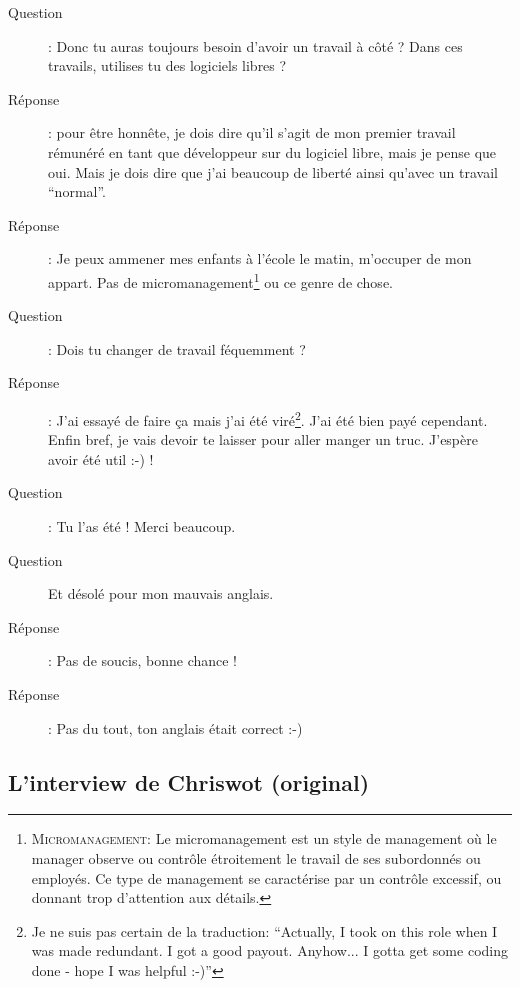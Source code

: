 \documentclass[a4paper,12pt, draft]{report}
\begin{document}
\begin{description}
\item [Question]:  Donc tu auras toujours besoin d'avoir un travail à côté ? Dans ces travails, utilises tu des logiciels libres ?
\item [Réponse]:  pour être honnête, je dois dire qu'il s'agit de mon premier travail rémunéré en tant que développeur sur du logiciel libre, mais je pense que oui. Mais je dois dire que j'ai beaucoup de liberté ainsi qu'avec un travail ``normal''.
\item [Réponse]:  Je peux ammener mes enfants à l'école le matin, m'occuper de mon appart. Pas de micromanagement\footnote{\textsc{Micromanagement}: Le micromanagement est un style de management où le manager observe ou contrôle étroitement le travail de ses subordonnés ou employés. Ce type de management se caractérise par un contrôle excessif, ou donnant trop d'attention aux détails.} ou ce genre de chose.
\item [Question]:  Dois tu changer de travail féquemment ?
\item [Réponse]:  J'ai essayé de faire ça mais j'ai été viré\footnote{Je ne suis pas certain de la traduction: ``Actually, I took on this role when I was made redundant. I got a good payout. Anyhow... I gotta get some coding done - hope I was helpful :-)''}. J'ai été bien payé cependant. Enfin bref, je vais devoir te laisser pour aller manger un truc. J'espère avoir été util :-) !
\item [Question]:  Tu l'as été ! Merci beaucoup.
\item [Question] Et désolé pour mon mauvais anglais.
\item [Réponse]:  Pas de soucis, bonne chance !
\item [Réponse]:  Pas du tout, ton anglais était correct :-)

\end{description}


\subsection{L'interview de Chriswot (original)}
\end{document}
